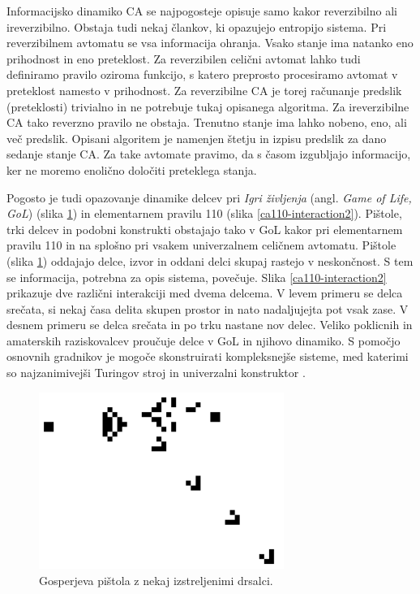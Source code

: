 \documentclass[12pt,a4paper,openany,twoside]{book}
\begin{document}
Informacijsko dinamiko CA se najpogosteje opisuje samo kakor reverzibilno ali ireverzibilno.
Obstaja tudi nekaj člankov, ki opazujejo entropijo sistema.
Pri reverzibilnem avtomatu se vsa informacija ohranja. Vsako stanje ima natanko eno prihodnost in eno preteklost.
Za reverzibilen celični avtomat lahko tudi definiramo pravilo oziroma funkcijo,
s katero preprosto procesiramo avtomat v preteklost namesto v prihodnost.
Za reverzibilne CA je torej računanje predslik (preteklosti)
trivialno in ne potrebuje tukaj opisanega algoritma.
Za ireverzibilne CA tako reverzno pravilo ne obstaja.
Trenutno stanje ima lahko nobeno, eno, ali več predslik.
Opisani algoritem je namenjen štetju in izpisu predslik za dano sedanje stanje CA.
Za take avtomate pravimo, da s časom izgubljajo informacijo,
ker ne moremo enolično določiti preteklega stanja.

Pogosto je tudi opazovanje dinamike delcev pri \emph{Igri življenja} (angl. \emph{Game of Life, GoL}) \cite{WikiGoL} (slika \ref{gospers_glider_gun})
in elementarnem pravilu 110 \cite{WikiRule110} (slika \ref{ca110-interaction2}).
Pištole, trki delcev in podobni konstrukti obstajajo tako v GoL kakor pri elementarnem pravilu 110
in na splošno pri vsakem univerzalnem celičnem avtomatu.
Pištole (slika \ref{gospers_glider_gun}) oddajajo delce, izvor in oddani delci skupaj rastejo v neskončnost.
S tem se informacija, potrebna za opis sistema, povečuje.
Slika \ref{ca110-interaction2} prikazuje dve različni interakciji med dvema delcema.
V levem primeru se delca srečata, si nekaj časa delita skupen prostor in nato nadaljujejta pot vsak zase.
V desnem primeru se delca srečata in po trku nastane nov delec.
Veliko poklicnih in amaterskih raziskovalcev proučuje delce v GoL in njihovo dinamiko.
S pomočjo osnovnih gradnikov je mogoče skonstruirati kompleksnejše sisteme, med katerimi so
najzanimivejši Turingov stroj \cite{Rendell2001} in univerzalni konstruktor \cite{Greene2013}.

\vspace{5mm}
\begin{figure}[htb]
\centerline{\includegraphics[width=8cm]{gospers_glider_gun}}
\caption[Gosperjeva pištola.]
{Gosperjeva pištola z nekaj izstreljenimi drsalci.}
\label{gospers_glider_gun}
\end{figure}
\end{document}
